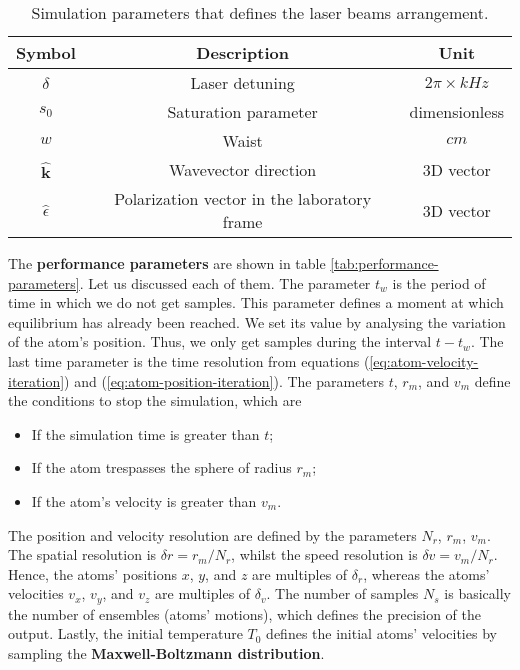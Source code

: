\begin{table}[!ht]
    \centering
    \caption{Simulation parameters that defines the laser beams arrangement.}
    \begin{tabular}{|c|c|c|}
        \hline
        \textbf{Symbol} & \textbf{Description} & \textbf{Unit} \\ \hline
        $ \delta $ & Laser detuning & $ 2\pi \times kHz $ \\
        $ s_0 $ & Saturation parameter & dimensionless \\
        $ w $ & Waist & $ cm $ \\
        $ \hat{\mathbf{k}} $ & Wavevector direction & 3D vector \\
        $ \hat{\epsilon} $ & Polarization vector in the laboratory frame & 3D vector \\
        \hline
    \end{tabular}
    \vspace{10px}
    \label{tab:laser-beams-arrangement-parameters}
\end{table}

The \textbf{performance parameters} are shown in table \ref{tab:performance-parameters}. Let us discussed each of them. The parameter $ t_{w} $ is the period of time in which we do not get samples. This parameter defines a moment at which equilibrium has already been reached. We set its value by analysing the variation of the atom's position. Thus, we only get samples during the interval $ t - t_{w} $. The last time parameter is the time resolution from equations (\ref{eq:atom-velocity-iteration}) and (\ref{eq:atom-position-iteration}). The parameters $ t $, $ r_{m} $, and $ v_{m} $ define the conditions to stop the simulation, which are
\begin{itemize}
    \item If the simulation time is greater than $ t $;
    \item If the atom trespasses the sphere of radius $ r_{m} $;
    \item If the atom's velocity is greater than $ v_{m} $.
\end{itemize}
The position and velocity resolution are defined by the parameters $ N_{r} $, $ r_{m} $, $ v_{m} $. The spatial resolution is $ \delta r = r_{m} / N_{r} $, whilst the speed resolution is $ \delta v = v_{m} / N_r $. Hence, the atoms' positions $ x $, $ y $, and $ z $ are multiples of $ \delta_r $, whereas the atoms' velocities $ v_x $, $ v_y $, and $ v_z $ are multiples of $ \delta_v $. The number of samples $ N_{s} $ is basically the number of ensembles (atoms' motions), which defines the precision of the output. Lastly, the initial temperature $ T_0 $ defines the initial atoms' velocities by sampling the \textbf{Maxwell-Boltzmann distribution}.

